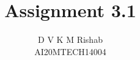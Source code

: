 \documentclass[journal,12pt,twocolumn]{IEEEtran}
\begin{document}
\makeatletter
{}
\makeatother
\let\StandardTheFigure\thefigure
\let\vec\mathbf
\def\putbox#1#2#3{\makebox[0in][l]{\makebox[#1][l]{}\raisebox{\baselineskip}[0in][0in]{\raisebox{#2}[0in][0in]{#3}}}}
     \def\rightbox#1{\makebox[0in][r]{#1}}
     \def\centbox#1{\makebox[0in]{#1}}
     \def\topbox#1{\raisebox{-\baselineskip}[0in][0in]{#1}}
     \def\midbox#1{\raisebox{-0.5\baselineskip}[0in][0in]{#1}}
\vspace{3cm}
\title{Assignment 3.1}
\author{D V K M Rishab \\ AI20MTECH14004}
%
%
%
% 
%
\end{document}
